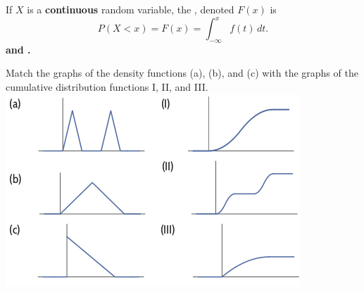 \clearpage

\begin{tcolorbox}
\begin{definition}\label{def:cdf2}
If $X$ is a \textbf{continuous} random variable, the \textbf{}, denoted $F(x)$ is
\[ P(X < x) = F(x) = \int_{-\infty}^x f(t) \, dt.\]
\textbf{ and .}
\end{definition}
\end{tcolorbox}

\bb[resume]
\begin{multicols}{2}
\ii Match the graphs of the density functions (a), (b), and (c)  with the graphs of the cumulative distribution functions I, II, and III.\label{graph-match}
\columnbreak
\includegraphics[width=0.5\tw]{06/06match.png}
\end{multicols}
\ee






